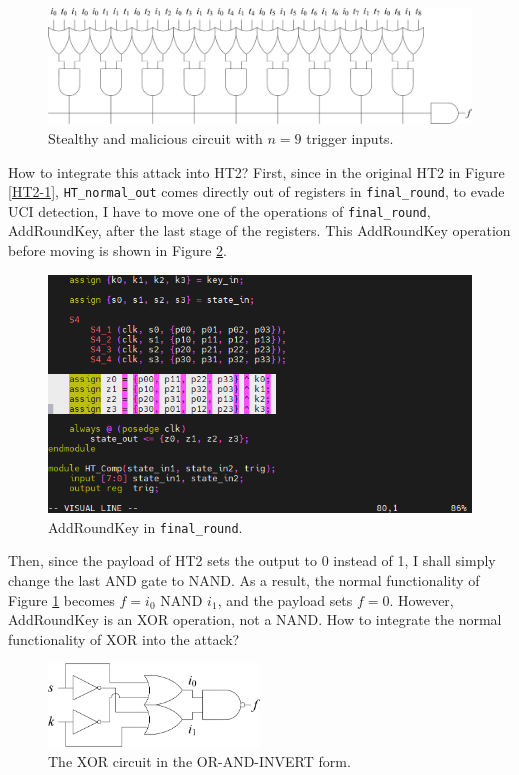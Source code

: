 \documentclass{article}
\begin{document}
\begin{figure}[h] \centering
\includegraphics[width=\textwidth]{Product of sums attack}
\caption{Stealthy and malicious circuit with $n=9$ trigger inputs.}
\label{Product of sums attack}
\end{figure}

How to integrate this attack into HT2? First, since in the original HT2 in Figure \ref{HT2-1}, \verb|HT_normal_out| comes directly out of registers in \verb|final_round|, to evade UCI detection, I have to move one of the operations of \verb|final_round|,\\AddRoundKey, after the last stage of the registers. This AddRoundKey operation before moving is shown in Figure \ref{AddRoundKey}.

\begin{figure}[h] \centering
\includegraphics[width=\textwidth]{AddRoundKey}
\caption{AddRoundKey in \texttt{final\_round}.}
\label{AddRoundKey}
\end{figure}

Then, since the payload of HT2 sets the output to 0 instead of 1, I shall simply change the last AND gate to NAND. As a result, the normal functionality of Figure \ref{Product of sums attack} becomes $f=i_0\text{ NAND }i_1$, and the payload sets $f=0$. However, AddRoundKey is an XOR operation, not a NAND. How to integrate the normal functionality of XOR into the attack?

\begin{figure}[h] \centering
\includegraphics[width=0.5\textwidth]{XOR_OAI}
\caption{The XOR circuit in the OR-AND-INVERT form.}
\label{XOR_OAI}
\end{figure}
\end{document}
